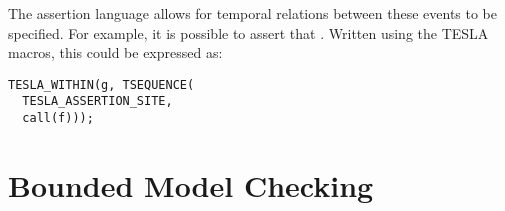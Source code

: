 The assertion language allows for temporal relations between these events to be
specified. For example, it is possible to assert that . Written using the TESLA macros, this could be expressed as:

\begin{verbatim}
TESLA_WITHIN(g, TSEQUENCE(
  TESLA_ASSERTION_SITE,
  call(f)));
\end{verbatim}

\section{Bounded Model Checking}

\iffalse

\begin{figure}[ht]
  \centering
  \begin{tikzpicture}[>=latex',initial text={},
                      node distance=3cm,on grid,auto]
    \node[state,initial,accepting] (only) [] {};
    \node [draw,dashed,fit=(only),inner sep=0.3cm] {};
  \end{tikzpicture}
  \caption{Null Assertion}
  \label{fig:gv}
\end{figure}

\begin{figure}[ht]
  \centering
  \begin{tikzpicture}[>=latex',initial text={},
                      node distance=3cm,on grid,auto]
    \node[state,initial] (start) [] {};
    \node[state,accepting] (end) [right=of start] {};
    \node[draw,dashed,fit=(start) (end), inner sep=0.3cm] {};
    \path[->] (start) edge node {event} (end);
  \end{tikzpicture}
  \caption{Single Event Automaton}
  \label{fig:gv}
\end{figure}

\fi
